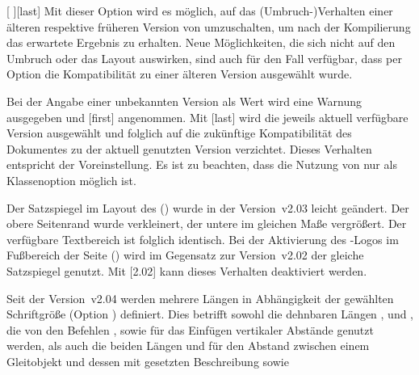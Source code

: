 \begin{Declaration}[v2.03]{[%
  \textOR{}\textOR{}%
]}[last]
\printdeclarationlist%
%
%
Mit dieser Option wird es möglich, auf das (Umbruch-)Verhalten einer älteren 
respektive früheren Version von \TUDScript umzuschalten, um nach der 
Kompilierung das erwartete Ergebnis zu erhalten. Neue Möglichkeiten, die sich 
nicht auf den Umbruch oder das Layout auswirken, sind auch für den Fall 
verfügbar, dass per Option die Kompatibilität zu einer älteren Version 
ausgewählt wurde. 

Bei der Angabe einer unbekannten Version als Wert wird eine Warnung ausgegeben 
und [first] angenommen. Mit [last] wird die 
jeweils aktuell verfügbare Version ausgewählt und folglich auf die zukünftige 
Kompatibilität des Dokumentes zu der aktuell genutzten Version verzichtet. 
Dieses Verhalten entspricht der Voreinstellung. Es ist zu beachten, dass die 
Nutzung von  nur als Klassenoption möglich ist.
%
\begin{values}
\item[\PValue{2.02}\textOR\PValue{first}]
  Der Satzspiegel im Layout des \CDs () wurde in der 
  Version~v2.03 leicht geändert. Der obere Seitenrand wurde verkleinert, der 
  untere im gleichen Maße vergrößert. Der verfügbare Textbereich ist folglich 
  identisch. Bei der Aktivierung des \DDC-Logos im Fußbereich der Seite
  () wird im Gegensatz zur Version~v2.02 der gleiche 
  Satzspiegel genutzt. Mit [2.02] kann dieses Verhalten 
  deaktiviert werden.
\item[\PValue{2.03}]
  Seit der Version~v2.04 werden mehrere Längen in Abhängigkeit der gewählten 
  Schriftgröße (Option ) definiert. Dies betrifft sowohl die 
  dehnbaren Längen ,  und 
  , die von den Befehlen ,   
   sowie  für das Einfügen vertikaler Abstände 
  genutzt werden, als auch die beiden Längen  und 
   für den Abstand zwischen einem Gleitobjekt und 
  dessen mit  gesetzten Beschreibung sowie  

\end{values}
\end{Declaration}

